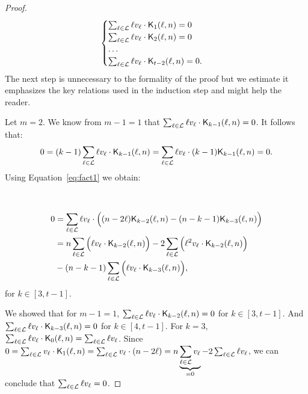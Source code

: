 \begin{proof}
    \begin{equation*}
        \begin{cases}
            \sum_{\ell \in \mathcal{L}} \ell v_\ell \cdot \mathsf{K}_{1}(\ell,n) = 0\\
            \sum_{\ell \in \mathcal{L}} \ell v_\ell \cdot \mathsf{K}_{2}(\ell,n) = 0\\
            \ldots\\
            \sum_{\ell \in \mathcal{L}} \ell v_\ell \cdot \mathsf{K}_{t-2}(\ell,n) = 0.\\
        \end{cases}
    \end{equation*}
    The next step is unnecessary to the formality of the proof but we estimate it emphasizes the key relations used in the induction step and might help the reader.

    Let $m = 2$. We know from $m - 1 = 1$ that $\sum_{\ell \in \mathcal{L}} \ell v_\ell \cdot \mathsf{K}_{k-1}(\ell,n) = 0$. It follows that:
    $$
    0 = (k-1)\sum_{\ell \in \mathcal{L}} \ell v_\ell \cdot \mathsf{K}_{k-1}(\ell,n) = \sum_{\ell \in \mathcal{L}} \ell v_\ell \cdot (k-1)\mathsf{K}_{k-1}(\ell,n) = 0.
    $$
    Using Equation~\ref{eq:fact1} we obtain:
    
    ~
    
    \begin{equation*}
    \begin{split}
        0 &= \sum_{\ell \in \mathcal{L}} \ell v_\ell \cdot \Big( (n - 2\ell)\mathsf{K}_{k-2}(\ell,n) - (n - k - 1)\mathsf{K}_{k-3}(\ell,n) \Big)\\
        & = n \sum_{\ell \in \mathcal{L}} \Big( \ell v_\ell \cdot \mathsf{K}_{k-2}(\ell,n) \Big) - 2\sum_{\ell \in \mathcal{L}} \Big( \ell^2v_\ell \cdot \mathsf{K}_{k-2}(\ell,n) \Big)\\& - (n - k - 1)\sum_{\ell \in \mathcal{L}} \Big( \ell v_\ell \cdot \mathsf{K}_{k-3}(\ell,n) \Big),
    \end{split}
    \end{equation*}
    for $k \in [3, t - 1]$.

    We showed that for $m - 1 = 1$, $\sum_{\ell \in \mathcal{L}} \ell v_\ell \cdot \mathsf{K}_{k-2}(\ell,n) = 0$ for $k \in [3, t-1]$.
    And $\sum_{\ell \in \mathcal{L}} \ell v_\ell \cdot \mathsf{K}_{k-3}(\ell,n) = 0$ for $k \in [4, t-1]$.
    For $k = 3$, $\sum_{\ell \in \mathcal{L}} \ell v_\ell \cdot \mathsf{K}_{0}(\ell,n) = \sum_{\ell \in \mathcal{L}} \ell v_\ell$.
    Since $0 = \sum_{\ell \in \mathcal{L}} v_\ell \cdot \mathsf{K}_{1}(\ell,n) = \sum_{\ell \in \mathcal{L}} v_\ell \cdot(n - 2\ell) = n\underbrace{\sum_{\ell \in \mathcal{L}} v_\ell}_{=0} -2\sum_{\ell \in \mathcal{L}} \ell v_\ell$, we can conclude that $\sum_{\ell \in \mathcal{L}}\ell v_\ell = 0$.


\end{proof}
